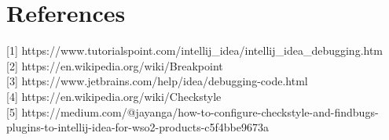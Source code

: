 \documentclass[10pt]{article}
\begin{document}
\section{References}
{[1]} https://www.tutorialspoint.com/intellij\_idea/intellij\_idea\_debugging.htm\\
{[2]} https://en.wikipedia.org/wiki/Breakpoint\\
{[3]} https://www.jetbrains.com/help/idea/debugging-code.html\\
{[4]} https://en.wikipedia.org/wiki/Checkstyle\\
{[5]} https://medium.com/@jayanga/how-to-configure-checkstyle-and-findbugs-plugins-to-intellij-idea-for-wso2-products-c5f4bbe9673a\\
\end{document}
